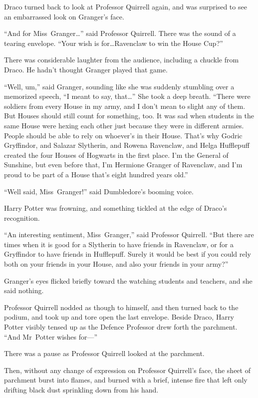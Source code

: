 Draco turned back to look at Professor Quirrell again, and was surprised to see an embarrassed look on Granger’s face.

“And for Miss~Granger…” said Professor Quirrell. There was the sound of a tearing envelope. “Your wish is for…Ravenclaw to win the House Cup?”

There was considerable laughter from the audience, including a chuckle from Draco. He hadn’t thought Granger played that game.

“Well, um,” said Granger, sounding like she was suddenly stumbling over a memorized speech, “I meant to say, that…” She took a deep breath. “There were soldiers from every House in my army, and I don’t mean to slight any of them. But Houses should still count for something, too. It was sad when students in the same House were hexing each other just because they were in different armies. People should be able to rely on whoever’s in their House. That’s why Godric Gryffindor, and Salazar Slytherin, and Rowena Ravenclaw, and Helga Hufflepuff created the four Houses of Hogwarts in the first place. I’m the General of Sunshine, but even before that, I’m Hermione Granger of Ravenclaw, and I’m proud to be part of a House that’s eight hundred years old.”

“Well said, Miss~Granger!” said Dumbledore’s booming voice.

Harry Potter was frowning, and something tickled at the edge of Draco’s recognition.

“An interesting sentiment, Miss~Granger,” said Professor Quirrell. “But there are times when it is good for a Slytherin to have friends in Ravenclaw, or for a Gryffindor to have friends in Hufflepuff. Surely it would be best if you could rely both on your friends in your House, and also your friends in your army?”

Granger’s eyes flicked briefly toward the watching students and teachers, and she said nothing.

Professor Quirrell nodded as though to himself, and then turned back to the podium, and took up and tore open the last envelope. Beside Draco, Harry Potter visibly tensed up as the Defence Professor drew forth the parchment. “And Mr~Potter wishes for—”

There was a pause as Professor Quirrell looked at the parchment.

Then, without any change of expression on Professor Quirrell’s face, the sheet of parchment burst into flames, and burned with a brief, intense fire that left only drifting black dust sprinkling down from his hand.

